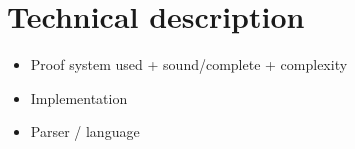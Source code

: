 \section{Technical description}

\begin{itemize}
\item{Proof system used + sound/complete + complexity}
\item{Implementation}
\item{Parser / language}
\end{itemize}
